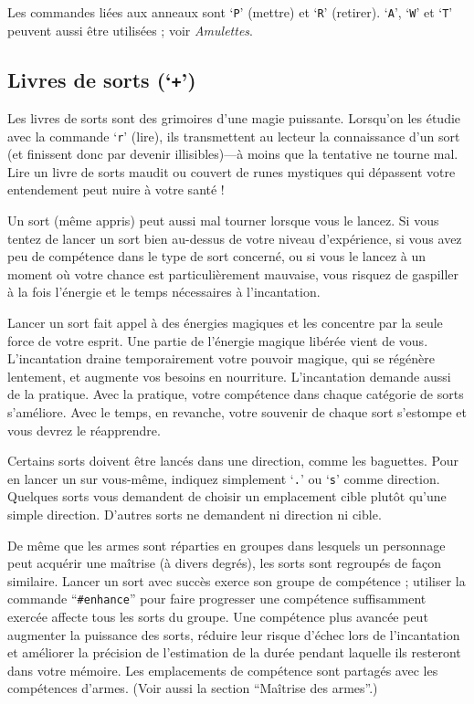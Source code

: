 \documentclass[titlepage]{article}
\begin{document}
Les commandes liées aux anneaux sont `\texttt{P}' (mettre) et `\texttt{R}' (retirer).
`\texttt{A}', `\texttt{W}' et `\texttt{T}' peuvent aussi être utilisées ; voir \textit{Amulettes}.

\subsection*{Livres de sorts (`\texttt{+}')}

Les livres de sorts sont des grimoires d'une magie puissante.  Lorsqu'on les étudie avec la commande `\texttt{r}' (lire),
ils transmettent au lecteur la connaissance d'un sort (et
finissent donc par devenir
illisibles)---à moins que la tentative ne tourne mal.
Lire un livre de sorts maudit ou couvert de runes mystiques qui dépassent
votre entendement peut nuire à votre santé !

Un sort (même appris) peut aussi mal tourner lorsque vous le lancez.  Si vous
tentez de lancer un sort bien au-dessus de votre niveau d'expérience, si vous avez
peu de compétence dans le type de sort concerné, ou si vous le lancez à
un moment où votre chance est particulièrement mauvaise, vous risquez de gaspiller
à la fois l'énergie et le temps nécessaires à l'incantation.

Lancer un sort fait appel à des énergies magiques et les concentre par
la seule force de votre esprit.  Une partie de l'énergie magique libérée vient
de vous.
L'incantation draine temporairement votre pouvoir magique, qui se régénère
lentement, et augmente vos besoins en nourriture.
L'incantation demande aussi de la pratique.  Avec la pratique, votre
compétence dans chaque catégorie de sorts s'améliore.  Avec le temps, en revanche,
votre souvenir de chaque sort s'estompe et vous devrez le réapprendre.

Certains sorts doivent être lancés dans une direction, comme les baguettes.
Pour en lancer un sur vous-même, indiquez simplement `\texttt{.}' ou `\texttt{s}' comme direction.
Quelques sorts vous demandent de choisir un emplacement cible plutôt qu'une
simple direction.
D'autres sorts ne demandent ni direction ni cible.

De même que les armes sont réparties en groupes dans lesquels un personnage peut
acquérir une maîtrise (à divers degrés), les sorts sont regroupés de façon similaire.
Lancer un sort avec succès exerce son groupe de compétence ; utiliser la
commande ``\texttt{\#enhance}'' pour faire progresser une compétence suffisamment exercée
affecte tous les sorts du groupe.  Une compétence plus avancée peut augmenter la
puissance des sorts, réduire leur risque d'échec lors de l'incantation
et améliorer la précision de l'estimation de la durée pendant laquelle ils
resteront dans votre mémoire.
Les emplacements de compétence sont partagés avec les compétences d'armes.  (Voir aussi la section
``Maîtrise des armes''.)
\end{document}
